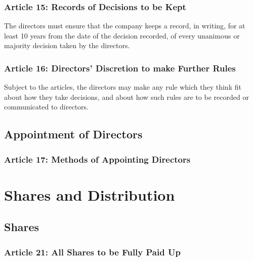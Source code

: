 \documentclass[letterpaper,10pt,openany,oneside,english]{sphinxmanual}
\begin{document}
\subsection{Article 15: Records of Decisions to be Kept}
\label{\detokenize{directors:article-15-records-of-decisions-to-be-kept}}\label{\detokenize{directors:article-15}}
The directors must ensure that the company keeps a record, in writing, for at least 10 years from the date of the decision recorded, of every unanimous or majority decision taken by the directors.


\subsection{Article 16: Directors’ Discretion to make Further Rules}
\label{\detokenize{directors:article-16-directors-discretion-to-make-further-rules}}\label{\detokenize{directors:article-16}}
Subject to the articles, the directors may make any rule which they think fit about how they take decisions, and about how such rules are to be recorded or communicated to directors.


\section{Appointment of Directors}
\label{\detokenize{directors:appointment-of-directors}}

\subsection{Article 17: Methods of Appointing Directors}
\label{\detokenize{directors:article-17-methods-of-appointing-directors}}\label{\detokenize{directors:article-17}}

\chapter{Shares and Distribution}
\label{\detokenize{shares:shares-and-distribution}}\label{\detokenize{shares::doc}}

\section{Shares}
\label{\detokenize{shares:shares}}

\subsection{Article 21: All Shares to be Fully Paid Up}
\label{\detokenize{shares:article-21-all-shares-to-be-fully-paid-up}}
\end{document}
